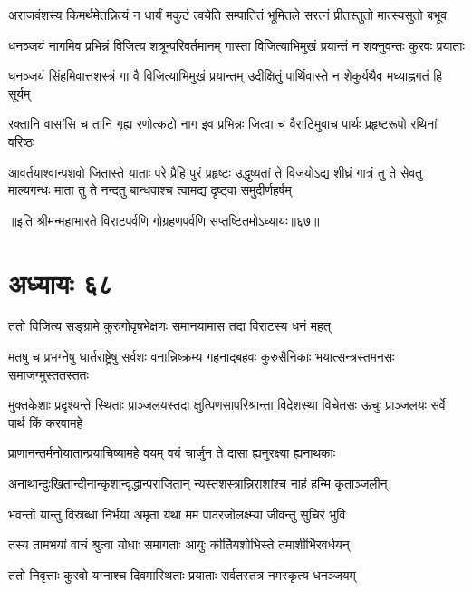 \twolineshloka
{अराजवंशस्य किमर्थमेतन्नित्यं न धार्यं मकुटं त्वयेति}
{सम्पातितं भूमितले सरत्नं प्रीतस्तुतो मात्स्यसुतो बभूव}


\twolineshloka
{धनञ्जयं नागमिव प्रभिन्नं विजित्य शत्रून्परिवर्तमानम्}
{गास्ता विजित्याभिमुखं प्रयान्तं न शक्नुवन्तः कुरवः प्रयाताः}


\twolineshloka
{धनञ्जयं सिंहमिवात्तशस्त्रं गा वै विजित्याभिमुखं प्रयान्तम्}
{उदीक्षितुं पार्थिवास्ते न शेकुर्यथैव मध्याह्नगतं हि सूर्यम्}


\twolineshloka
{रक्तानि वासांसि च तानि गृह्य रणोत्कटो नाग इव प्रभिन्नः}
{जित्वा च वैराटिमुवाच पार्थः प्रहृष्टरूपो रथिनां वरिष्ठः}


\threelineshloka
{आवर्तयाश्वान्पशवो जितास्ते याताः परे प्रैहि पुरं प्रहृष्टः}
{उद्धुष्यतां ते विजयोऽद्य शीघ्रं गात्रं तु ते सेवतु माल्यगन्धः}
{माता तु ते नन्दतु बान्धवाश्च त्वामद्य दृष्ट्वा समुदीर्णहर्षम्}

॥इति श्रीमन्महाभारते विराटपर्वणि गोग्रहणपर्वणि सप्तष्टितमोऽध्यायः॥६७॥

\chapter{अध्यायः ६८}

\twolineshloka
{ततो विजित्य सङ्ग्रामे कुरुगोवृषभेक्षणः}
{समानयामास तदा विराटस्य धनं महत्}


\threelineshloka
{मतषु च प्रभग्नेषु धार्तराष्ट्रेषु सर्वशः}
{वनान्निष्क्रम्य गहनाद्बहवः कुरुसैनिकाः}
{भयात्सन्त्रस्तमनसः समाजग्मुस्ततस्ततः}


\threelineshloka
{मुक्तकेशाः प्रदृश्यन्ते स्थिताः प्राञ्जलयस्तदा}
{क्षुत्पिणसापरिश्रान्ता विदेशस्था विचेतसः}
{ऊचुः प्राञ्जलयः सर्वे पार्थ किं करवामहे}


\twolineshloka
{प्राणानन्तर्मनोयातान्प्रयाचिष्यामहे वयम्}
{वयं चार्जुन ते दासा ह्यनुरक्ष्या ह्यनाथकाः}




\twolineshloka
{अनाथान्दुःखितान्दीनान्कृशान्वृद्धान्पराजितान्}
{न्यस्तशस्त्रान्निराशांश्च नाहं हन्मि कृताञ्जलीन्}


\twolineshloka
{भवन्तो यान्तु विस्रब्धा निर्भया अमृता यथा}
{मम पादरजोलक्ष्म्या जीवन्तु सुचिरं भुवि}


\twolineshloka
{तस्य तामभयां वाचं श्रुत्वा योधाः समागताः}
{आयुः कीर्तियशोभिस्ते तमाशीर्भिरवर्धयन्}


\twolineshloka
{ततो निवृत्ताः कुरवो यग्नाश्च दिवमास्थिताः}
{प्रयाताः सर्वतस्तत्र नमस्कृत्य धनञ्जयम्}


